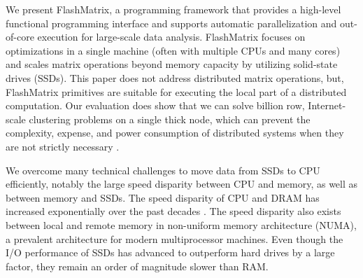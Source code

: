 

We present FlashMatrix, a programming framework that provides a high-level
functional programming interface and supports automatic
parallelization and out-of-core execution for large-scale data analysis.
FlashMatrix focuses on optimizations in a single machine (often with multiple
CPUs and many cores) and scales matrix operations beyond memory capacity by 
utilizing solid-state drives (SSDs).  
This paper does not address distributed matrix operations, but, 
FlashMatrix primitives are suitable for executing the local part of a distributed 
computation.   
Our evaluation does show that we can solve billion row, Internet-scale 
clustering problems on a single thick node, which can prevent the complexity,
expense, and power consumption of distributed systems when they are not strictly necessary
\cite{hotos}.








We overcome many technical challenges to move data from SSDs to CPU efficiently,
notably the large speed disparity between CPU and memory, as well as between
memory and SSDs. The speed disparity of CPU and DRAM has increased exponentially
over the past decades \cite{Wilkes01}. The speed disparity also exists between
local and remote memory in non-uniform memory architecture (NUMA), a prevalent
architecture for modern multiprocessor machines. Even though the I/O
performance of SSDs has advanced to outperform hard drives by a large factor,
they remain an order of magnitude slower than RAM.

